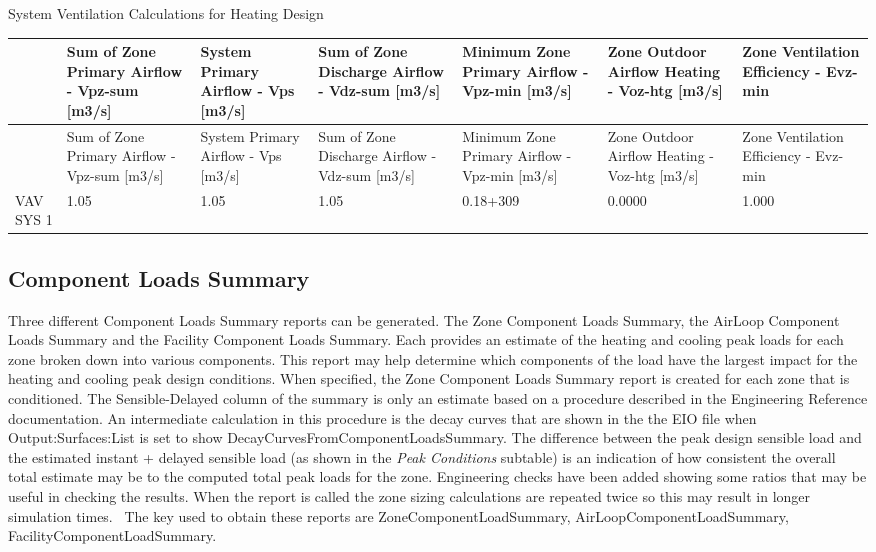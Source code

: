 System Ventilation Calculations for Heating Design

{\scriptsize
\begin{longtable}[c]{>{\raggedright}p{0.85in}>{\raggedright}p{0.85in}>{\raggedright}p{0.85in}>{\raggedright}p{0.85in}>{\raggedright}p{0.85in}>{\raggedright}p{0.85in}>{\raggedright}p{0.85in}}
\toprule 
 & Sum of Zone Primary Airflow - Vpz-sum [m3/s] & System Primary Airflow - Vps [m3/s] & Sum of Zone Discharge Airflow - Vdz-sum [m3/s] & Minimum Zone Primary Airflow - Vpz-min [m3/s] & Zone Outdoor Airflow Heating - Voz-htg [m3/s] & Zone Ventilation Efficiency - Evz-min \tabularnewline
\midrule
\endfirsthead

\toprule 
 & Sum of Zone Primary Airflow - Vpz-sum [m3/s] & System Primary Airflow - Vps [m3/s] & Sum of Zone Discharge Airflow - Vdz-sum [m3/s] & Minimum Zone Primary Airflow - Vpz-min [m3/s] & Zone Outdoor Airflow Heating - Voz-htg [m3/s] & Zone Ventilation Efficiency - Evz-min \tabularnewline
\midrule
\endhead

VAV SYS 1 & 1.05 & 1.05 & 1.05 & 0.18+309 & 0.0000 & 1.000 \tabularnewline
\bottomrule
\end{longtable}}

\subsection{Component Loads Summary}\label{component-loads-summary}

Three different Component Loads Summary reports can be generated. The Zone Component Loads Summary, the AirLoop Component Loads Summary and the Facility Component Loads Summary. Each provides an estimate of the heating and cooling peak loads for each zone broken down into various components. This report may help determine which components of the load have the largest impact for the heating and cooling peak design conditions. When specified, the Zone Component Loads Summary report is created for each zone that is conditioned. The Sensible-Delayed column of the summary is only an estimate based on a procedure described in the Engineering Reference documentation. An intermediate calculation in this procedure is the decay curves that are shown in the the EIO file when Output:Surfaces:List is set to show DecayCurvesFromComponentLoadsSummary. The difference between the peak design sensible load and the estimated instant + delayed sensible load (as shown in the \emph{Peak Conditions} subtable) is an indication of how consistent the overall total estimate may be to the computed total peak loads for the zone. Engineering checks have been added showing some ratios that may be useful in checking the results. When the report is called the zone sizing calculations are repeated twice so this may result in longer simulation times.~ The key used to obtain these reports are ZoneComponentLoadSummary, AirLoopComponentLoadSummary, FacilityComponentLoadSummary.

